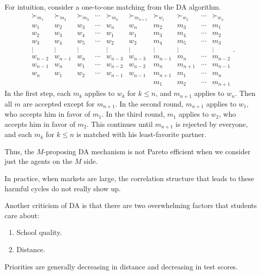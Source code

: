 \begin{example}
	For intuition, consider a one-to-one matching from the DA algorithm. \[
		\begin{array}{cccccc|cccc}
			\succ_{m_1} & \succ_{m_2} & \succ_{m_3} & \cdots & \succ_{m_n} & \succ_{m_{n+1}} & \succ_{w_1} & \succ_{w_2} & \cdots & \succ_{w_n}\\
				\hline
			w_1 & w_2 & w_3 & \cdots & w_n & w_n & m_2 & m_3 & \cdots & m_1 \\
			w_2 & w_3 & w_4 & \cdots & w_1 & w_1 & m_3 & m_4 & \cdots & m_2 \\
			w_3 & w_4 & w_5 & \cdots & w_2 & w_2 & m_4 & m_5 & \cdots & m_3 \\
			\vdots & \vdots & \vdots & & \vdots & \vdots & \vdots & \vdots & & \vdots \\
			w_{n-2} & w_{n-1} & w_n & \cdots & w_{n-3} & w_{n-3} & m_{n-1} & m_n & \cdots & m_{n-2} \\
			w_{n-1} & w_n & w_1 & \cdots & w_{n-2} & w_{n-2} & m_n & m_{n+1} & \cdots & m_{n-1} \\
			w_n & w_1 & w_2 & \cdots & w_{n-1} & w_{n-1} & m_{n+1} & m_1 & \cdots & m_n \\
			    &     &     &        &           &           & m_1 & m_2 & \cdots & m_{n+1}
		\end{array}
	.\]
	In the first step, each $m_k$ applies to $w_k$ for $k\le n$, and $m_{n+1}$ applies to $w_n$. Then all $m$ are accepted except for $m_{n+1}$.
	In the second round, $m_{n+1}$ applies to $w_1$, who accepts him in favor of $m_1$. In the third round, $m_1$ applies to $w_2$, who accepts him in favor of $m_2$.
	This continues until $m_{n+1}$ is rejected by everyone, and each $m_k $ for $k\le n$ is matched with his least-favorite partner.

	Thus, the $M$-proposing DA mechanism is not Pareto efficient when we consider just the agents on the $M$ side.
\end{example}
In practice, when markets are large, the correlation structure that leads to these harmful cycles do not really show up.

Another criticism of DA is that there are two overwhelming factors that students care about:
\begin{enumerate}[label = (\roman*)]
	\item School quality.
	\item Distance.
\end{enumerate}
Priorities are generally decreasing in distance and decreasing in test scores.

